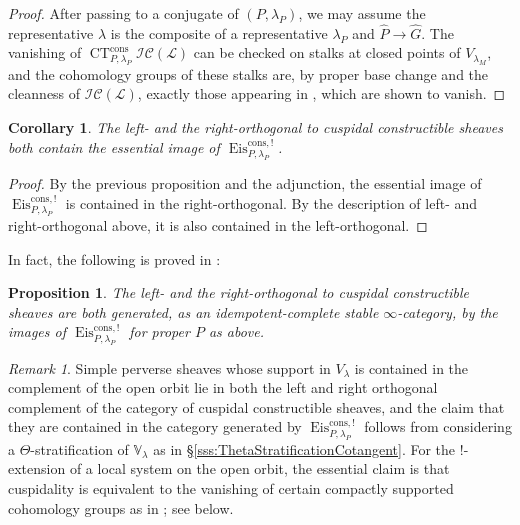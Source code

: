 \documentclass{amsart}
\newtheorem{proposition}[theorem]{Proposition}
\newtheorem{corollary}[theorem]{Corollary}
\theoremstyle{definition}
\theoremstyle{remark}
\newtheorem{remark}[theorem]{Remark}
\numberwithin{equation}{section}
\newcommand{\mc}{\mathcal}
\newcommand{\wh}{\widehat}
\DeclareMathOperator{\Eis}{\mathrm{Eis}}
\DeclareMathOperator{\CT}{\mathrm{CT}}
\newcommand{\V}{\mathbb{V}}
\begin{document}
\begin{proof}
After passing to a conjugate of $(P, \lambda_P)$, we may assume the representative $\lambda$ is the composite of a representative $\lambda_P$ and $\wh P\to \wh G$. The vanishing of $\CT_{P, \lambda_P}^{\mathrm{cons}}\mc{IC} (\mc L)$ can be checked on stalks at closed points of $V_{\lambda_M}$, and the cohomology groups of these stalks are, by proper base change and the cleanness of $\mc{IC}(\mc L)$, exactly those appearing in \cite[\S 4.4(c)]{LusztigGraded}, which are shown to vanish. 
\end{proof}

\begin{corollary}
The left- and the right-orthogonal to cuspidal constructible sheaves both contain the essential image of $\Eis_{P,\lambda_P}^{\mathrm{cons}, !}$.  
\end{corollary}

\begin{proof}
By the previous proposition and the adjunction, the essential image of $\Eis_{P, \lambda_P}^{\mathrm{cons}, !}$ is contained in the right-orthogonal. By the description of left- and right-orthogonal above, it is also contained in the left-orthogonal. 
\end{proof}

In fact, the following is proved in \cite{LusztigGraded}:

\begin{proposition}\label{prop: OrthogonalCuspidalConstructibleSheaves}
The left- and the right-orthogonal to cuspidal constructible sheaves are both generated, as an idempotent-complete stable $\infty$-category, by the images of $\Eis_{P,\lambda_P}^{\mathrm{cons}, !}$ for proper $P$ as above. 
\end{proposition}

\begin{remark}
Simple perverse sheaves whose support in $V_\lambda$ is contained in the complement of the open orbit lie in both the left and right orthogonal complement of the category of cuspidal constructible sheaves, and the claim that they are contained in the category generated by $\Eis_{P,\lambda_P}^{\mathrm{cons}, !}$ follows from considering a $\Theta$-stratification of $\V_\lambda$ as in \S \ref{sss:ThetaStratificationCotangent}. For the $!$-extension of a local system on the open orbit, the essential claim is that cuspidality is equivalent to the vanishing of certain compactly supported cohomology groups as in \cite[\S 4.4(c)]{LusztigGraded}; see below.  
\end{remark}
\end{document}
